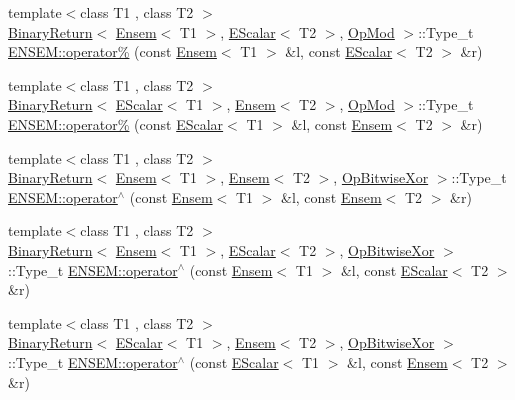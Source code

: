 \begin{DoxyCompactItemize}
{\footnotesize template$<$class T1 , class T2 $>$ }\\\mbox{\hyperlink{structENSEM_1_1BinaryReturn}{Binary\+Return}}$<$ \mbox{\hyperlink{classENSEM_1_1Ensem}{Ensem}}$<$ T1 $>$, \mbox{\hyperlink{classENSEM_1_1EScalar}{E\+Scalar}}$<$ T2 $>$, \mbox{\hyperlink{structENSEM_1_1OpMod}{Op\+Mod}} $>$\+::Type\+\_\+t \mbox{\hyperlink{group__eensem_gac6f1dfc7f3ac04dea5a10016a1cf8994}{E\+N\+S\+E\+M\+::operator\%}} (const \mbox{\hyperlink{classENSEM_1_1Ensem}{Ensem}}$<$ T1 $>$ \&l, const \mbox{\hyperlink{classENSEM_1_1EScalar}{E\+Scalar}}$<$ T2 $>$ \&r)
\item 
{\footnotesize template$<$class T1 , class T2 $>$ }\\\mbox{\hyperlink{structENSEM_1_1BinaryReturn}{Binary\+Return}}$<$ \mbox{\hyperlink{classENSEM_1_1EScalar}{E\+Scalar}}$<$ T1 $>$, \mbox{\hyperlink{classENSEM_1_1Ensem}{Ensem}}$<$ T2 $>$, \mbox{\hyperlink{structENSEM_1_1OpMod}{Op\+Mod}} $>$\+::Type\+\_\+t \mbox{\hyperlink{group__eensem_ga00d0a959bef6d8cd4aa976de1482281d}{E\+N\+S\+E\+M\+::operator\%}} (const \mbox{\hyperlink{classENSEM_1_1EScalar}{E\+Scalar}}$<$ T1 $>$ \&l, const \mbox{\hyperlink{classENSEM_1_1Ensem}{Ensem}}$<$ T2 $>$ \&r)
\item 
{\footnotesize template$<$class T1 , class T2 $>$ }\\\mbox{\hyperlink{structENSEM_1_1BinaryReturn}{Binary\+Return}}$<$ \mbox{\hyperlink{classENSEM_1_1Ensem}{Ensem}}$<$ T1 $>$, \mbox{\hyperlink{classENSEM_1_1Ensem}{Ensem}}$<$ T2 $>$, \mbox{\hyperlink{structENSEM_1_1OpBitwiseXor}{Op\+Bitwise\+Xor}} $>$\+::Type\+\_\+t \mbox{\hyperlink{group__eensem_gac8825f09186c8e0f8550839946bf2d37}{E\+N\+S\+E\+M\+::operator$^\wedge$}} (const \mbox{\hyperlink{classENSEM_1_1Ensem}{Ensem}}$<$ T1 $>$ \&l, const \mbox{\hyperlink{classENSEM_1_1Ensem}{Ensem}}$<$ T2 $>$ \&r)
\item 
{\footnotesize template$<$class T1 , class T2 $>$ }\\\mbox{\hyperlink{structENSEM_1_1BinaryReturn}{Binary\+Return}}$<$ \mbox{\hyperlink{classENSEM_1_1Ensem}{Ensem}}$<$ T1 $>$, \mbox{\hyperlink{classENSEM_1_1EScalar}{E\+Scalar}}$<$ T2 $>$, \mbox{\hyperlink{structENSEM_1_1OpBitwiseXor}{Op\+Bitwise\+Xor}} $>$\+::Type\+\_\+t \mbox{\hyperlink{group__eensem_ga6558c3ffb3c2fcd52505cddbc3c0b310}{E\+N\+S\+E\+M\+::operator$^\wedge$}} (const \mbox{\hyperlink{classENSEM_1_1Ensem}{Ensem}}$<$ T1 $>$ \&l, const \mbox{\hyperlink{classENSEM_1_1EScalar}{E\+Scalar}}$<$ T2 $>$ \&r)
\item 
{\footnotesize template$<$class T1 , class T2 $>$ }\\\mbox{\hyperlink{structENSEM_1_1BinaryReturn}{Binary\+Return}}$<$ \mbox{\hyperlink{classENSEM_1_1EScalar}{E\+Scalar}}$<$ T1 $>$, \mbox{\hyperlink{classENSEM_1_1Ensem}{Ensem}}$<$ T2 $>$, \mbox{\hyperlink{structENSEM_1_1OpBitwiseXor}{Op\+Bitwise\+Xor}} $>$\+::Type\+\_\+t \mbox{\hyperlink{group__eensem_gac576149a62d51c7020e2452341351129}{E\+N\+S\+E\+M\+::operator$^\wedge$}} (const \mbox{\hyperlink{classENSEM_1_1EScalar}{E\+Scalar}}$<$ T1 $>$ \&l, const \mbox{\hyperlink{classENSEM_1_1Ensem}{Ensem}}$<$ T2 $>$ \&r)

\end{DoxyCompactItemize}
